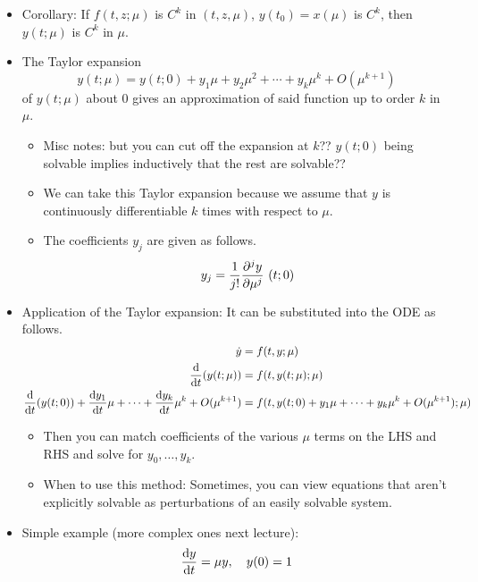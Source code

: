 \documentclass[../notes.tex]{subfiles}
\begin{document}
\begin{itemize}
\begin{equation*}
    \end{equation*}
    \item Corollary: If $f(t,z;\mu)$ is $C^k$ in $(t,z,\mu)$, $y(t_0)=x(\mu)$ is $C^k$, then $y(t;\mu)$ is $C^k$ in $\mu$.
    \item The Taylor expansion
    \begin{equation*}
        y(t;\mu) = y(t;0)+y_1\mu+y_2\mu^2+\cdots+y_k\mu^k+O(\mu^{k+1})
    \end{equation*}
    of $y(t;\mu)$ about 0 gives an approximation of said function up to order $k$ in $\mu$.
    \begin{itemize}
        \item Misc notes: but you can cut off the expansion at $k$?? $y(t;0)$ being solvable implies inductively that the rest are solvable??
        \item We can take this Taylor expansion because we assume that $y$ is continuously differentiable $k$ times with respect to $\mu$.
        \item The coefficients $y_j$ are given as follows.
        \begin{equation*}
            y_j = \frac{1}{j!}\pdv[j]{y}{\mu}~(t;0)
        \end{equation*}
    \end{itemize}
    \item Application of the Taylor expansion: It can be substituted into the ODE as follows.
    \begin{align*}
        \dot{y} &= f(t,y;\mu)\\
        \dv{t}(y(t;\mu)) &= f(t,y(t;\mu);\mu)\\
        \dv{t}(y(t;0))+\dv{y_1}{t}\mu+\cdots+\dv{y_k}{t}\mu^k+O(\mu^{k+1}) &= f(t,y(t;0)+y_1\mu+\cdots+y_k\mu^k+O(\mu^{k+1});\mu)
    \end{align*}
    \begin{itemize}
        \item Then you can match coefficients of the various $\mu$ terms on the LHS and RHS and solve for $y_0,\dots,y_k$.
        \item When to use this method: Sometimes, you can view equations that aren't explicitly solvable as perturbations of an easily solvable system.
    \end{itemize}
    \item Simple example (more complex ones next lecture):
    \begin{equation*}
        \dv{y}{t} = \mu y
        ,\quad
        y(0) = 1
    \end{equation*}

\end{itemize}
\end{document}
